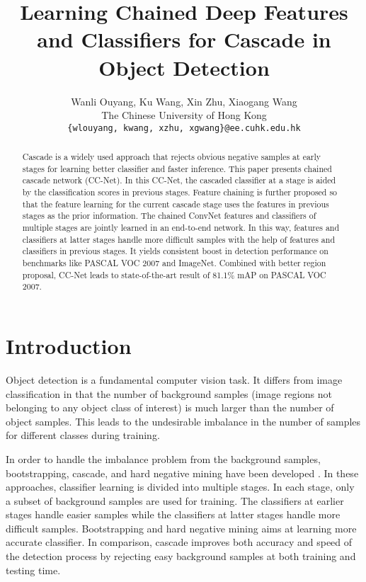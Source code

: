 \documentclass[10pt,twocolumn,letterpaper]{article}
\begin{document}
\title{Learning Chained Deep Features and Classifiers for Cascade in Object Detection}

\author{Wanli Ouyang,  Ku Wang, Xin Zhu, Xiaogang Wang \\
The Chinese University of Hong Kong\\
{\tt\small \{wlouyang, kwang, xzhu, xgwang\}@ee.cuhk.edu.hk}
}

\maketitle

\begin{abstract}
Cascade is a widely used approach that rejects obvious negative samples at early stages for learning better classifier and faster inference.
This paper presents chained cascade network (CC-Net). In this CC-Net, the cascaded classifier at a stage is aided by the classification scores in previous stages. Feature chaining is further proposed so that the feature learning for the current cascade stage uses the features in previous stages as the prior information. The chained ConvNet features and classifiers of multiple stages are jointly learned in an end-to-end network. In this way, features and classifiers at latter stages handle more difficult samples with the help of features and classifiers in previous stages.  It yields consistent boost in detection performance on benchmarks like PASCAL VOC 2007 and ImageNet.
Combined with better region proposal, CC-Net leads to state-of-the-art result of 81.1\% mAP on PASCAL VOC 2007.
\end{abstract}

\section{Introduction}
Object detection is a fundamental computer vision task. 
It differs from image classification in that the number of background samples (image regions not belonging to any object class of interest) is much larger than the number of object samples. This leads to the undesirable imbalance in the number of samples for different classes during training.

In order to handle the imbalance problem from the background samples, bootstrapping, cascade, and hard negative mining have been developed \cite{sung1996learning,Dalal:HOG,Viola:HaarConf}. In these approaches, classifier learning is divided into multiple stages. In each stage, only a subset of background samples are used for training. The classifiers at earlier stages handle easier samples while the classifiers at latter stages handle more difficult samples. Bootstrapping and hard negative mining aims at learning more accurate classifier.  In comparison, cascade improves both accuracy and speed of the detection process by rejecting easy background samples at both training and testing time. 
\end{document}
